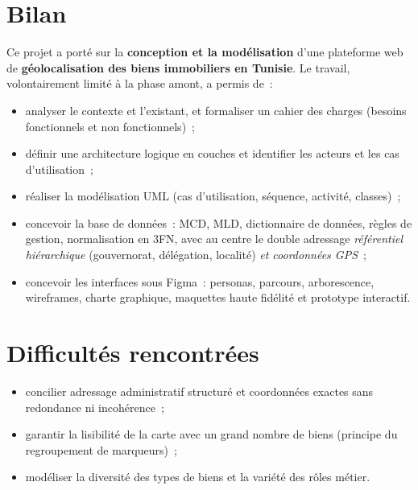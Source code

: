 
\section{Bilan}

Ce projet a porté sur la \textbf{conception et la modélisation} d'une plateforme
web de \textbf{géolocalisation des biens immobiliers en Tunisie}. Le travail,
volontairement limité à la phase amont, a permis de~:

\begin{itemize}[label=\textbullet,itemsep=1pt]
  \item analyser le contexte et l'existant, et formaliser un cahier des charges
        (besoins fonctionnels et non fonctionnels)~;
  \item définir une architecture logique en couches et identifier les acteurs et
        les cas d'utilisation~;
  \item réaliser la modélisation UML (cas d'utilisation, séquence, activité,
        classes)~;
  \item concevoir la base de données~: MCD, MLD, dictionnaire de données, règles
        de gestion, normalisation en 3FN, avec au centre le double adressage
        \emph{référentiel hiérarchique} (gouvernorat, délégation, localité)
        \emph{et coordonnées GPS}~;
  \item concevoir les interfaces sous Figma~: personas, parcours, arborescence,
        wireframes, charte graphique, maquettes haute fidélité et prototype
        interactif.
\end{itemize}

\section{Difficultés rencontrées}
\begin{itemize}[label=\textbullet,itemsep=1pt]
  \item concilier adressage administratif structuré et coordonnées exactes sans
        redondance ni incohérence~;
  \item garantir la lisibilité de la carte avec un grand nombre de biens
        (principe du regroupement de marqueurs)~;
  \item modéliser la diversité des types de biens et la variété des rôles métier.
\end{itemize}

